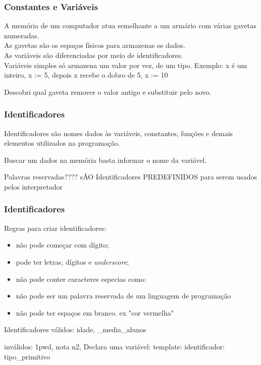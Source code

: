 \begin{frame}
	\frametitle{Constantes e Variáveis}
	A memória de um computador atua semelhante a um armário com várias gavetas numeradas.\\

	As gavetas são os espaços físicos para armazenas os dados.\\

	As variáveis são diferenciadas por meio de identificadores.\\


	Variáveis simples só armazena um valor por vez, de um tipo.
	Exemplo: x é um inteiro, x := 5, depois x recebe o dobro de 5, x := 10

	Descobri qual gaveta remover o valor antigo e substituir pelo novo.
\end{frame}





\begin{frame}
	\frametitle{Identificadores}
	Identificadores são nomes dados às variáveis, constantes, funções e demais elementos utilizados na programação.

	Buscar um dados na memória basta informar o nome da variável.

	Palavras reservadas???? sÃO Identificadores PREDEFINIDOS para serem usados pelos interpretador
\end{frame}



\begin{frame}
	\frametitle{Identificadores}
	Regras para criar identificadores:\\

	\begin{itemize}
		\item não pode começar com dígito;
		\item pode ter letras, dígitos e \textit{underscore};
		\item não pode conter caracteres especias como: 
		\item não pode ser um palavra reservada de um linguagem de programação
		\item não pode ter espaços em branco. ex "cor vermelha"
	\end{itemize}
	
	Identificadores válidos:
	idade, \_media\_alunos

	inválidos:
	1pwd, nota n2, 
	Declara uma variável:
	template: identificador: tipo\_primitivo
\end{frame}





